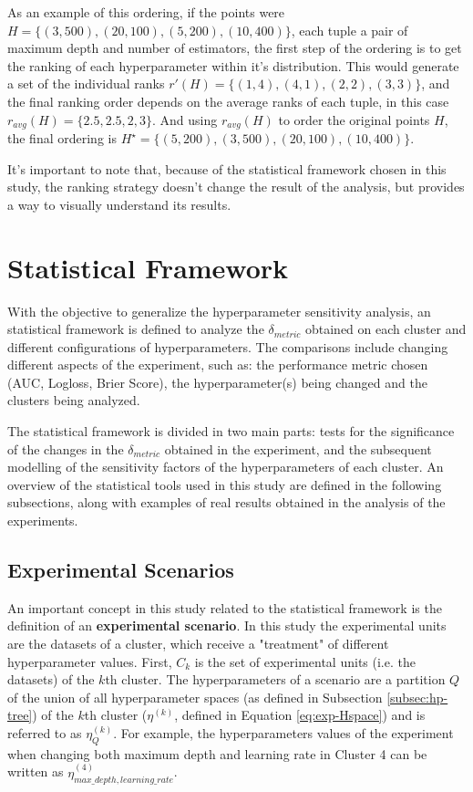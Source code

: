 As an example of this ordering, if the points were $H = \{(3, 500), (20, 100), (5, 200), (10, 400)\}$, each tuple a 
pair of maximum depth and number of estimators, the first step of the ordering is to get the ranking of each hyperparameter within it's distribution. This would generate a set of the individual ranks $r'(H) = \{(1, 4), (4, 1), (2, 2), (3, 3)\}$, and the final ranking order depends on the average ranks of each tuple, in this case $r_{avg}(H) = \{2.5, 2.5, 2, 3\}$. And using $r_{avg}(H)$ to order the original points $H$, the final ordering is $H^\star = \{(5, 200), (3, 500), (20, 100), (10, 400)\}$.

It's important to note that, because of the statistical framework chosen in this study, the ranking strategy doesn't change the result of the analysis, but provides a way to visually understand its results.

\section{Statistical Framework}

With the objective to generalize the hyperparameter sensitivity analysis, an statistical framework is defined to analyze the $\delta_{metric}$ obtained on each cluster and different configurations of hyperparameters. The comparisons include changing different aspects of the experiment, such as: the performance metric chosen (AUC, Logloss, Brier Score), the hyperparameter(s) being changed and the clusters being analyzed.

The statistical framework is divided in two main parts: tests for the significance of the changes in the $\delta_{metric}$ obtained in the experiment, and the subsequent modelling of the sensitivity factors of the hyperparameters of each cluster. An overview of the statistical tools used in this study are defined in the following subsections, along with examples of real results obtained in the analysis of the experiments.

\subsection{Experimental Scenarios}

An important concept in this study related to the statistical framework is the definition of an \textbf{experimental scenario}. In this study the experimental units are the datasets of a cluster, which receive a "treatment" of different hyperparameter values. First, $C_k$ is the set of experimental units (i.e. the datasets) of the $k$th cluster. The hyperparameters of a scenario are a partition $Q$ of the union of all hyperparameter spaces (as defined in Subsection \ref{subsec:hp-tree}) of the $k$th cluster ($\eta^{(k)}$, defined in Equation \ref{eq:exp-Hspace}) and is referred to as  $\eta^{(k)}_Q$. For example, the hyperparameters values of the experiment when changing both maximum depth and learning rate in Cluster 4 can be written as $\eta^{(4)}_{max\_depth, learning\_rate}$.

